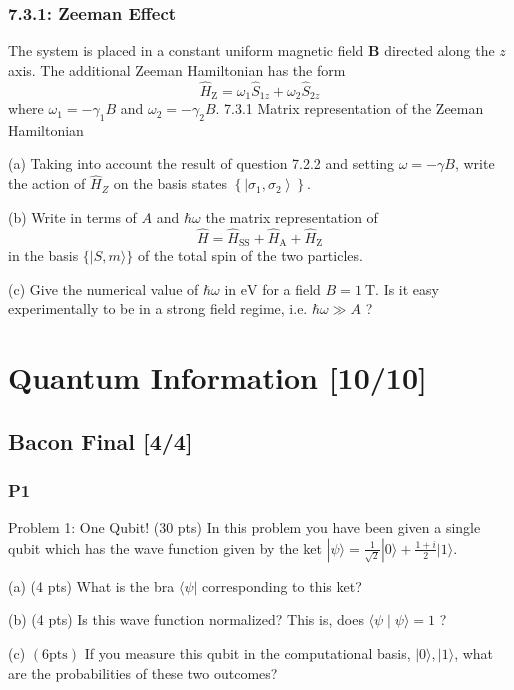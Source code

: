 \documentclass[11pt]{article}
\begin{document}
\subsubsection{7.3.1: Zeeman Effect}
\label{sec:org6e5e67d}
The system is placed in a constant uniform magnetic field \(\boldsymbol{B}\)
directed along the \(z\) axis. The additional Zeeman Hamiltonian has the form $$
\hat{H}_{\mathrm{Z}}=\omega_1 \hat{S}_{1 z}+\omega_2 \hat{S}_{2 z} $$ where \(\omega_1=-\gamma_1 B\)
and \(\omega_2=-\gamma_2 B\). 7.3.1 Matrix representation of the Zeeman Hamiltonian

(a) Taking into account the result of question 7.2.2 and setting \(\omega=-\gamma B\), write
the action of \(\hat{H}_Z\) on the basis states \(\left\{\left|\sigma_1,
\sigma_2\right\rangle\right\}\).

(b) Write in terms of \(A\) and \(\hbar \omega\) the matrix representation of $$
\hat{H}=\hat{H}_{\mathrm{SS}}+\hat{H}_{\mathrm{A}}+\hat{H}_{\mathrm{Z}} $$ in
the basis \(\{|S, m\rangle\}\) of the total spin of the two particles.

(c) Give the numerical value of \(\hbar \omega\) in \(\mathrm{eV}\) for a field \(B=1
\mathrm{~T}\). Is it easy experimentally to be in a strong field regime, i.e. \(\hbar
\omega \gg A\) ?
\section{Quantum Information [10/10]}
\label{sec:orge9801cf}
\subsection{Bacon Final [4/4]}
\label{sec:org66183fd}
\subsubsection{P1}
\label{sec:org072ffc9}
Problem 1: One Qubit! (30 pts) In this problem you have been given a single
qubit which has the wave function given by the ket
\(|\psi\rangle=\frac{1}{\sqrt{2}}|0\rangle+\frac{1+i}{2}|1\rangle\).

(a) (4 pts) What is the bra \(\langle\psi|\) corresponding to this ket?

(b) (4 pts) Is this wave function normalized? This is, does \(\langle\psi \mid \psi\rangle=1\) ?

(c) \((6 \mathrm{pts})\) If you measure this qubit in the computational basis,
\(|0\rangle,|1\rangle\), what are the probabilities of these two outcomes?
\end{document}
